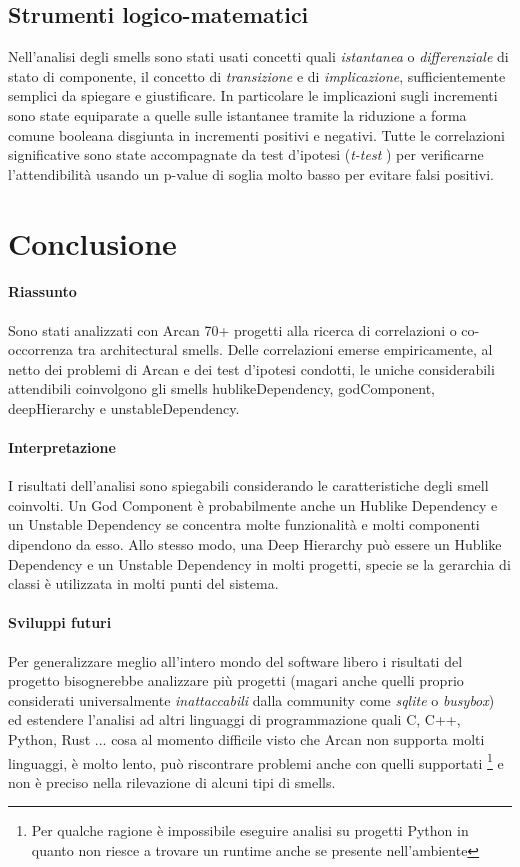 \documentclass[a4paper,11pt,oneside, table]{article}
\begin{document}
  \subsection{Strumenti logico-matematici}

  Nell'analisi degli smells sono stati usati concetti quali \textit{istantanea} o \textit{differenziale} di stato di componente, il concetto di \textit{transizione} e di \textit{implicazione}, sufficientemente semplici da spiegare e giustificare. In particolare le implicazioni sugli incrementi sono state equiparate a quelle sulle istantanee tramite la riduzione a forma comune booleana disgiunta in incrementi positivi e negativi. Tutte le correlazioni significative sono state accompagnate da test d'ipotesi (\textit{t-test} \cite{sun2020microbiome}) per verificarne l'attendibilit\`a usando un p-value di soglia molto basso \cite{head2015extent} per evitare falsi positivi.

  \section{Conclusione}

  \paragraph{Riassunto}
  Sono stati analizzati con Arcan 70+ progetti alla ricerca di correlazioni o co-occorrenza tra architectural smells. Delle correlazioni emerse empiricamente, al netto dei problemi di Arcan e dei test d'ipotesi condotti, le uniche considerabili attendibili coinvolgono gli smells hublikeDependency, godComponent, deepHierarchy e unstableDependency.

  \paragraph{Interpretazione}
  I risultati dell'analisi sono spiegabili considerando le caratteristiche degli smell coinvolti.
  Un God Component \`e probabilmente anche un Hublike Dependency e un Unstable Dependency se concentra molte funzionalit\`a e molti componenti dipendono da esso. Allo stesso modo, una Deep Hierarchy pu\`o essere un Hublike Dependency e un Unstable Dependency in molti progetti, specie se la gerarchia di classi \`e utilizzata in molti punti del sistema.

  \paragraph{Sviluppi futuri}
  Per generalizzare meglio all'intero mondo del software libero i risultati del progetto bisognerebbe analizzare pi\`u progetti (magari anche quelli proprio considerati universalmente \textit{inattaccabili} dalla community come \textit{sqlite} o \textit{busybox}) ed estendere l'analisi ad altri linguaggi di programmazione quali C, C++, Python, Rust ... cosa al momento difficile visto che Arcan non supporta molti linguaggi, \`e molto lento, pu\`o riscontrare problemi anche con quelli supportati \footnote{Per qualche ragione \`e impossibile eseguire analisi su progetti Python in quanto non riesce a trovare un runtime anche se presente nell'ambiente} e non \`e preciso nella rilevazione di alcuni tipi di smells.

  \printbibliography[title={Bibliografia}]
\end{document}

